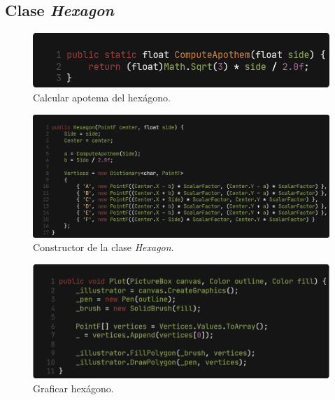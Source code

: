 \documentclass[oneside, a4paper]{article}
\begin{document}
        \subsection{Clase \textit{Hexagon}}

            \begin{figure}[H]
                \centering
                \includegraphics[width=\textwidth]{compute_apothem.png}
                \caption{Calcular apotema del hexágono.}
                \label{fig:compute_apothem}
            \end{figure}

            \begin{figure}[H]
                \centering
                \includegraphics[width=\textwidth]{hexagon_constructor.png}
                \caption{Constructor de la clase \textit{Hexagon}.}
                \label{fig:hexagon_constructor}
            \end{figure}

            \begin{figure}[H]
                \centering
                \includegraphics[width=\textwidth]{plot_hexagon.png}
                \caption{Graficar hexágono.}
                \label{fig:plot_hexagon}
            \end{figure}
\end{document}
